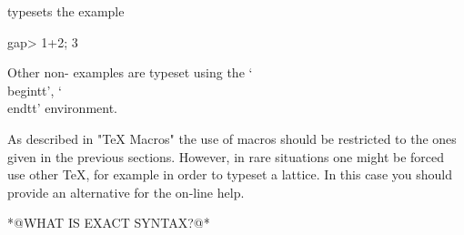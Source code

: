 typesets the example

\beginexample
    gap> 1+2;
    3
\endexample

Other non-{\GAP} examples are typeset using the `\\begintt', `\\endtt'
environment.


As  described in "TeX Macros"  the use of  macros should be restricted to
the ones given in the previous sections.  However, in rare situations one
might be forced  use  other {\TeX}, for  example  in order  to  typeset a
lattice.  In this case you should provide  an alternative for the on-line
help.

*@WHAT IS EXACT SYNTAX?@*

